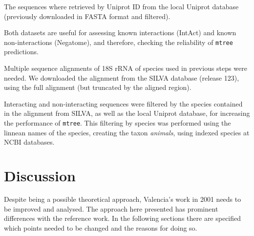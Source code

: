 \documentclass[11pt]{article}
\begin{document}
The sequences where retrieved by Uniprot ID from the local Uniprot database (previously downloaded in FASTA format and filtered). 

Both datasets are useful for assessing known interactions (IntAct) and known non-interactions (Negatome), and therefore, checking the reliability of \texttt{mtree} predictions.

Multiple sequence alignments of 18S rRNA of species used in previous steps were needed. We downloaded the alignment from the SILVA database\cite{SILVA} (release 123), using the full alignment (but truncated by the aligned region).

Interacting and non-interacting sequences were filtered by the species contained in the alignment from SILVA, as well as the local Uniprot database, for increasing the performance of \texttt{mtree}. This filtering by species was performed using the linnean names of the species, creating the taxon \textit{animals}, using indexed species at NCBI databases.



\section{Discussion}
Despite being a possible theoretical approach, Valencia's work in 2001\cite{Pazos2001} needs to be improved and analysed. The approach here presented has prominent differences with the reference work. In the following sections there are specified which points needed to be changed and the reasons for doing so.
\end{document}
